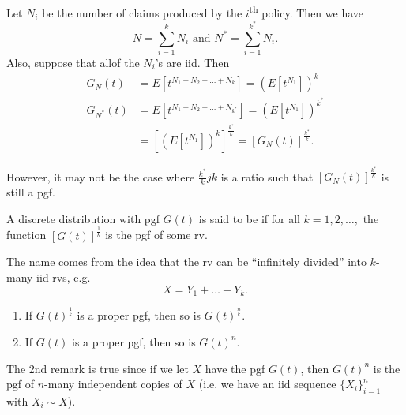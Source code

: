 \documentclass[notoc,notitlepage]{tufte-book}
\begin{document}
\begin{eg}
  Let $N_i$ be the number of claims produced by the $i$\textsuperscript{th} policy. Then we have
  \begin{equation*}
    N = \sum_{i=1}^{k} N_i \text{ and } N^* = \sum_{i=1}^{k^*} N_i.
  \end{equation*}
  Also, suppose that allof the $N_i$'s are iid. Then
  \begin{align*}
    G_N(t) &= E \left[ t^{N_1 + N_2 + \hdots + N_k} \right] = \left( E \left[ t^{N_1} \right] \right)^k \\
    G_{N^*}(t) &= E \left[ t^{N_1 + N_2 + \hdots + N_{k^*}} \right] = \left( E \left[ t^{N_1} \right] \right)^{k^*} \\
               &= \left[ \left( E \left[ t^{N_1} \right] \right)^k \right]^{\frac{k^*}{k}} = \left[ G_N(t) \right]^{\frac{k^*}{k}}.
  \end{align*}
\end{eg}

However, it may not be the case where $\frac{k^*}{k}jk$ is a ratio such that $\left[ G_N(t) \right]^{\frac{k^*}{k}}$ is still a pgf.

\begin{defn}\label{defn:infinitely_divisible}
  A discrete distribution with pgf $G(t)$ is said to be  if for all $k =1, 2, \ldots,$ the function $\left[ G(t) \right]^{\frac{1}{k}}$ is the pgf of some rv.
\end{defn}

\begin{remark}[Namesake]
  The name comes from the idea that the rv can be ``infinitely divided'' into $k$-many iid rvs, e.g.
  \begin{equation*}
    X = Y_1 + \hdots + Y_k.
  \end{equation*}
\end{remark}

\begin{remark}
  \begin{enumerate}
    \item If $G(t)^\frac{1}{k}$ is a proper pgf, then so is $G(t)^\frac{n}{k}$.
    \item If $G(t)$ is a proper pgf, then so is $G(t)^n$.
  \end{enumerate}

  The 2nd remark is true since if we let $X$ have the pgf $G(t)$, then $G(t)^n$ is the pgf of $n$-many independent copies of $X$ (i.e. we have an iid sequence $\{ X_i \}_{i = 1}^{n}$ with $X_i \sim X$).
\end{remark}
\end{document}
